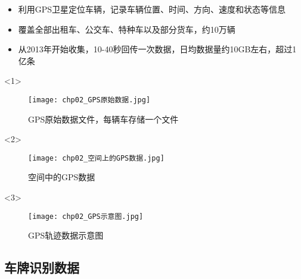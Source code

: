 \begin{frame}[t]{\subsecname}
\begin{itemize}
\item<1-> 利用GPS卫星定位车辆，记录车辆位置、时间、方向、速度和状态等信息
\item<1-> 覆盖全部出租车、公交车、特种车以及部分货车，约10万辆
\item<2-> 从2013年开始收集，10-40秒回传一次数据，日均数据量约10GB左右，超过1亿条 
\end{itemize}

\begin{overlayarea}{\textwidth}{\textheight}

  \begin{onlyenv}<1>
\begin{figure}
  \centering
  \texttt{[image: chp02\_GPS原始数据.jpg]}
  \caption{GPS原始数据文件，每辆车存储一个文件}
\end{figure}
  \end{onlyenv}

\vspace{-15pt}
  \begin{onlyenv}<2>
\begin{figure}
  \centering
  \texttt{[image: chp02\_空间上的GPS数据.jpg]}
  \caption{空间中的GPS数据}
\end{figure}
  \end{onlyenv}

\vspace{5pt}
  \begin{onlyenv}<3>
\begin{figure}
  \centering
  \texttt{[image: chp02\_GPS示意图.jpg]}
  \caption{GPS轨迹数据示意图}
\end{figure}
  \end{onlyenv}

\end{overlayarea}
\end{frame}

\subsection{车牌识别数据}

